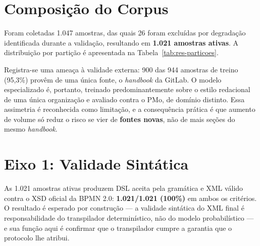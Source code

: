 \section{Composição do Corpus}
\label{sec:res-corpus}

Foram coletadas 1.047 amostras, das quais 26 foram excluídas por degradação identificada durante a validação, resultando em \textbf{1.021 amostras ativas}. A distribuição por partição é apresentada na Tabela~\ref{tab:res-particoes}.

\begin{table}[h!]
\end{table}

Registra-se uma ameaça à validade externa: 900 das 944 amostras de treino (95,3\%) provêm de uma única fonte, o \textit{handbook} da GitLab. O modelo especializado é, portanto, treinado predominantemente sobre o estilo redacional de uma única organização e avaliado contra o PMo, de domínio distinto. Essa assimetria é reconhecida como limitação, e a consequência prática é que aumento de volume só reduz o risco se vier de \textbf{fontes novas}, não de mais seções do mesmo \textit{handbook}.

\section{Eixo 1: Validade Sintática}
\label{sec:res-eixo1}

As 1.021 amostras ativas produzem DSL aceita pela gramática e XML válido contra o XSD oficial da BPMN 2.0: \textbf{1.021/1.021 (100\%)} em ambos os critérios. O resultado é esperado por construção — a validade sintática do XML final é responsabilidade do transpilador determinístico, não do modelo probabilístico — e sua função aqui é confirmar que o transpilador cumpre a garantia que o protocolo lhe atribui.


